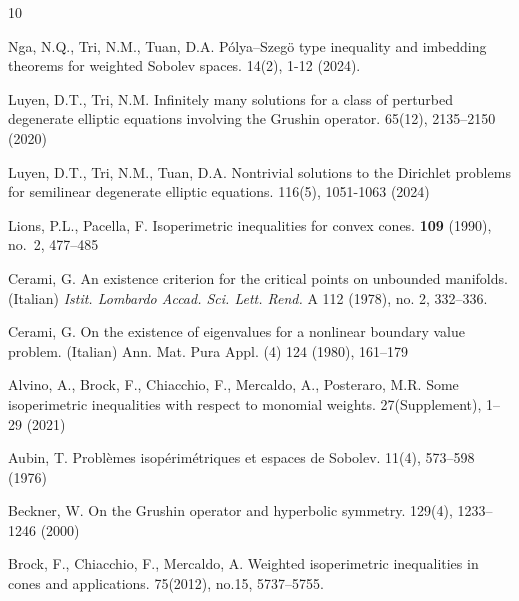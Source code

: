 \documentclass[10pt, reqno]{amsart}
\begin{document}
	
	\begin{thebibliography}{10}
		
		{\sc Nga, N.Q., Tri, N.M., Tuan, D.A.}
		\newblock P\'olya–Szeg\"o type inequality and imbedding theorems for weighted Sobolev spaces. 
		 14(2), 1-12 (2024).
		
		{\sc Luyen, D.T., Tri, N.M.}
		\newblock Infinitely many solutions for a class of perturbed degenerate elliptic equations involving the Grushin operator.
		 65(12), 2135–2150 (2020)
		
		{\sc Luyen, D.T., Tri, N.M., Tuan, D.A.}
		\newblock Nontrivial solutions to the Dirichlet problems for semilinear degenerate elliptic equations.
		 116(5), 1051-1063 (2024)
		
		{\sc Lions, P.L., Pacella, F.}
		\newblock Isoperimetric inequalities for convex cones.
		 {\bf 109} (1990), no.~2, 477--485
		
		{\sc Cerami, G.} 
		\newblock An existence criterion for the critical points on unbounded manifolds.
		\newblock (Italian) {\em Istit. Lombardo Accad. Sci. Lett. Rend.} A 112 (1978), no. 2, 332–336.
		
		{\sc Cerami, G.} 
		\newblock On the existence of eigenvalues for a nonlinear boundary value problem.
		\newblock (Italian) {\sc Ann. Mat. Pura Appl.} (4) 124 (1980), 161–179
		
		{\sc Alvino, A., Brock, F., Chiacchio, F., Mercaldo, A., Posteraro, M.R.}
		\newblock Some isoperimetric inequalities with respect to monomial weights.
		 27(Supplement), 1–29 (2021)
		
		{\sc Aubin, T.}
		\newblock Problèmes isopérimétriques et espaces de Sobolev. 
		 11(4), 573–598 (1976)
		
		{\sc Beckner, W.}
		\newblock On the Grushin operator and hyperbolic symmetry.
		 129(4), 1233–1246 (2000)
		
		{\sc Brock, F., Chiacchio, F., Mercaldo, A.}
		\newblock Weighted isoperimetric inequalities in cones and applications.
		 75(2012), no.15, 5737–5755.
		

\end{thebibliography}
\end{document}
